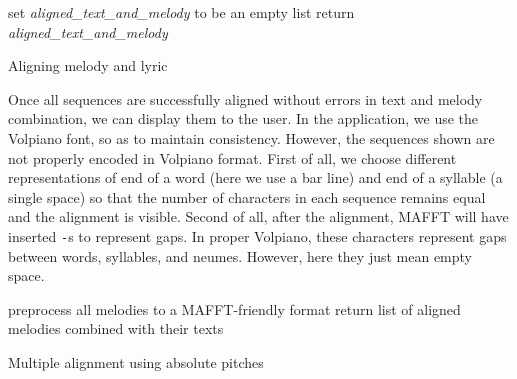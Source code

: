 \begin{algorithm}[H]
    \BlankLine
    set \emph{aligned\_text\_and\_melody} to be an empty list\;
    return \emph{aligned\_text\_and\_melody}\;
    \caption{Aligning melody and lyric}
    \label{algo:volpiano_text_combine}
\end{algorithm}

Once all sequences are successfully aligned without errors in text and melody combination, we can display them to the user. In the application, we use the Volpiano font,
so as to maintain consistency. However, the sequences shown are not properly encoded in Volpiano format. First of all, we choose different representations of end of a word
(here we use a bar line) and end of a syllable (a single space) so that the number of characters in each sequence remains equal and the alignment is visible. Second of all,
after the alignment, MAFFT will have inserted \verb|-|s to represent gaps. In proper Volpiano, these characters represent gaps between words, syllables, and neumes. However,
here they just mean empty space.\newline

\begin{algorithm}[H]
    \BlankLine
    preprocess all melodies to a MAFFT-friendly format\;
    return list of aligned melodies combined with their texts\;
    \caption{Multiple alignment using absolute pitches}
    \label{algo:align_pitch}
\end{algorithm}

